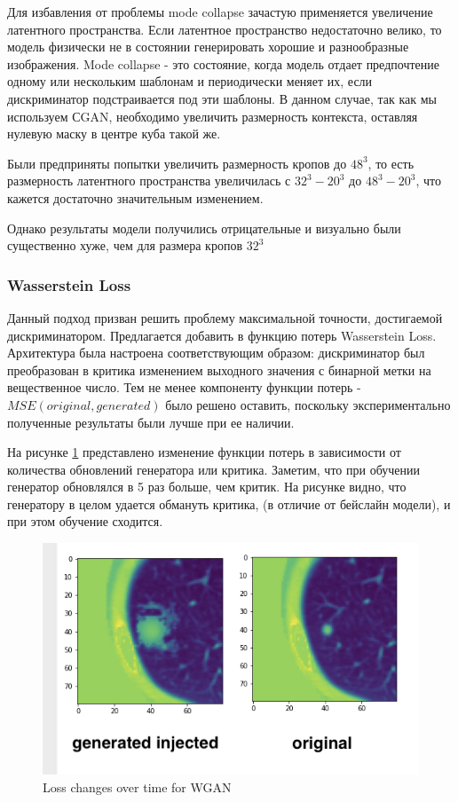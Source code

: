 Для избавления от проблемы mode collapse зачастую применяется увеличение латентного пространства. Если латентное пространство недостаточно велико, то модель физически не в состоянии генерировать хорошие и разнообразные изображения. Mode collapse - это состояние, когда модель отдает предпочтение одному или нескольким шаблонам и периодически меняет их, если дискриминатор подстраивается под эти шаблоны. В данном случае, так как мы используем СGAN, необходимо увеличить размерность контекста, оставляя нулевую маску в центре куба такой же.

Были предприняты попытки увеличить размерность кропов до $48^3$, то есть размерность латентного пространства увеличилась с $32^3 - 20^3$ до $48^3 - 20^3$, что кажется достаточно значительным изменением.

Однако результаты модели получились отрицательные и визуально были существенно хуже, чем для размера кропов $32^3$

\subsubsection{Wasserstein Loss}

Данный подход призван решить проблему максимальной точности, достигаемой дискриминатором. Предлагается добавить в функцию потерь Wasserstein Loss. Архитектура была настроена соответствующим образом: дискриминатор был преобразован в критика изменением выходного значения с бинарной метки на вещественное число. Тем не менее компоненту функции потерь - $MSE(original, generated)$ было решено оставить, поскольку экспериментально полученные результаты были лучше при ее наличии.

На рисунке \ref{loss} представлено изменение функции потерь в зависимости от количества обновлений генератора или критика. Заметим, что при обучении генератор обновлялся в 5 раз больше, чем критик. На рисунке видно, что генератору в целом удается обмануть критика, (в отличие от бейслайн модели), и при этом обучение сходится.

\begin{figure}[!h]
\includegraphics[width=\linewidth]{images/gan-injections/1.png}
\caption{Loss changes over time for WGAN}\label{loss}
\centering
\end{figure}

